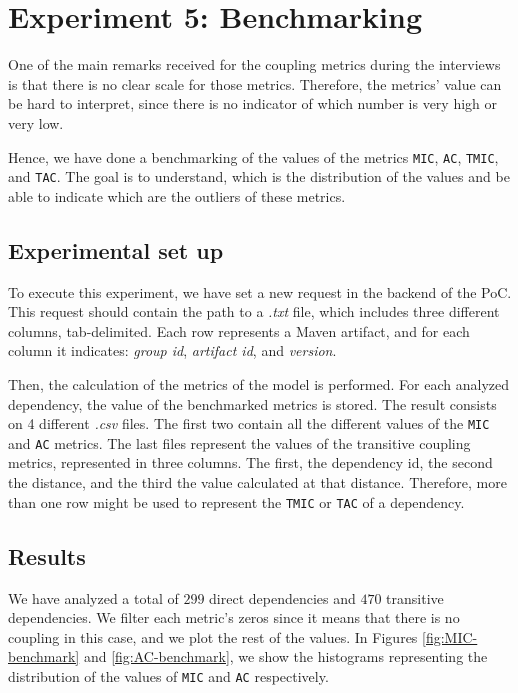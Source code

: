 \section{Experiment 5: Benchmarking}
One of the main remarks received for the coupling metrics during the interviews is that there is no clear scale for those metrics. Therefore, the metrics' value can be hard to interpret, since there is no indicator of which number is very high or very low.

Hence, we have done a benchmarking of the values of the metrics \texttt{MIC}, \texttt{AC}, \texttt{TMIC}, and \texttt{TAC}. The goal is to understand, which is the distribution of the values and be able to indicate which are the outliers of these metrics.

\subsection{Experimental set up}
To execute this experiment, we have set a new request in the backend of the PoC. This request should contain the path to a \textit{.txt} file, which includes three different columns, tab-delimited. Each row represents a Maven artifact, and for each column it indicates: \textit{group id}, \textit{artifact id}, and \textit{version}.

Then, the calculation of the metrics of the model is performed. For each analyzed dependency, the value of the benchmarked metrics is stored. The result consists on 4 different \textit{.csv} files. The first two contain all the different values of the \texttt{MIC} and \texttt{AC} metrics. The last files represent the values of the transitive coupling metrics, represented in three columns. The first, the dependency id, the second the distance, and the third the value calculated at that distance. Therefore, more than one row might be used to represent the \texttt{TMIC} or \texttt{TAC} of a dependency.

\subsection{Results}

We have analyzed a total of $299$ direct dependencies and $470$ transitive dependencies. We filter each metric's zeros since it means that there is no coupling in this case, and we plot the rest of the values. In Figures \ref{fig:MIC-benchmark} and \ref{fig:AC-benchmark}, we show the histograms representing the distribution of the values of \texttt{MIC} and \texttt{AC} respectively.

